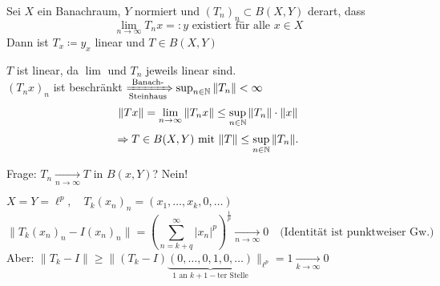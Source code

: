\begin{kor} \label{kor:9.7}
	Sei $X$ ein Banachraum, $Y$ normiert und $(T_{n})_{n} \subset B(X, Y)$ derart, dass
	\[ \lim_{n \rightarrow \infty} T_{n} x =: y \text{ existiert für alle } x \in X \]
	Dann ist $T_{x} \coloneqq y_{x}$ linear und $T \in B(X, Y)$
	\begin{beweis}
		$T$ ist linear, da $\lim$ und $T_{n}$ jeweils linear sind. \\
		$(T_{n} x)_{n}$ ist beschränkt $\xRightarrow[\text{Steinhaus}]{\text{Banach-}} \sup_{n \in \mathbb{N}} \| T_{n} \| < \infty$ \\
		\[ \| T x \| = \lim_{n \rightarrow \infty} \| T_{n} x \| \leq \sup_{n \in \mathbb{N}} \|T_{n} \| \cdot \|x \| \]
		\[ \Rightarrow T \in B(X, Y) \text{ mit } \| T \| \leq \sup_{n \in \mathbb{N}} \| T_{n} \|. \]
	\end{beweis}
\end{kor} 
Frage: $T_{n} \xrightarrow[n \rightarrow \infty]{} T$ in $B(x, Y)$? Nein! \\
\begin{beispiel*}
	$X = Y = \ell^{p}, \quad T_{k} (x_{n})_{n} = (x_{1}, \dotsc, x_{k}, 0, \dotsc)$ \\
	\[ \| T_{k} (x_{n})_{n} - I (x_{n})_{n} \| = \left( \sum_{n = k + q}^{\infty} | x_{n} |^{p} \right)^{\frac{1}{p}} \xrightarrow[n \rightarrow \infty]{} 0 \quad \text{(Identität ist punktweiser Gw.)} \]
	Aber: $\| T_{k} - I \| \geq \|(T_{k} - I)\underbrace{(0, \dotsc, 0, 1, 0, \dotsc)	}_{1 \text{ an } k+1-\text{ter Stelle}} \|_{\ell^{p}} = 1 \xrightarrow[k \rightarrow \infty]{} 0$
\end{beispiel*}



\newpage